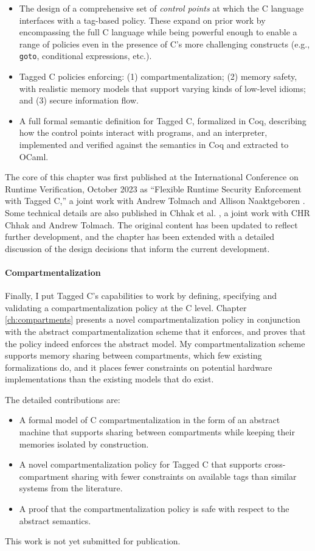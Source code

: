 \begin{itemize}
\item The design of a comprehensive set of {\em control points} at which the C language interfaces
  with a tag-based policy. These expand on prior work by encompassing the full C language
  while being powerful enough to enable a range of policies even in the presence of C's more
  challenging constructs (e.g., {\tt goto}, conditional expressions, etc.).
\item Tagged C policies enforcing: (1) compartmentalization;
  (2) memory safety, with realistic memory models that support varying kinds of low-level idioms;
  and (3) secure information flow.
\item A full formal semantic definition for Tagged C, formalized in Coq, describing how the
  control points interact with programs, and an interpreter, implemented and verified against
  the semantics in Coq and extracted to OCaml.
\end{itemize}

The core of this chapter was first published at the International Conference on Runtime Verification,
October 2023 as ``Flexible Runtime Security Enforcement with Tagged C,'' a joint work
with Andrew Tolmach and Allison Naaktgeboren \cite{Anderson23:TaggedC}. Some technical
details are also published in Chhak et al. \cite{}, a joint work with CHR Chhak and Andrew Tolmach.
The original content has been updated to reflect further development, and the chapter has been
extended with a detailed discussion of the design decisions that inform the current development.

\paragraph{Compartmentalization}

Finally, I put Tagged C's capabilities to work by defining, specifying and validating
a compartmentalization policy at the C level. Chapter \ref{ch:compartments} presents
a novel compartmentalization policy in conjunction with the abstract
compartmentalization scheme that it enforces, and proves that the policy indeed enforces the
abstract model. My compartmentalization scheme supports memory sharing between compartments,
which few existing formalizations do, and it places fewer constraints on potential hardware
implementations than the existing models that do exist.

The detailed contributions are:

\begin{itemize}
\item A formal model of C compartmentalization in the form of an abstract machine that
  supports sharing between compartments while keeping their memories isolated by construction.
\item A novel compartmentalization policy for Tagged C that supports cross-compartment
  sharing with fewer constraints on available tags than similar systems from the literature.
\item A proof that the compartmentalization policy is safe with respect to the abstract semantics.
\end{itemize}

This work is not yet submitted for publication.
